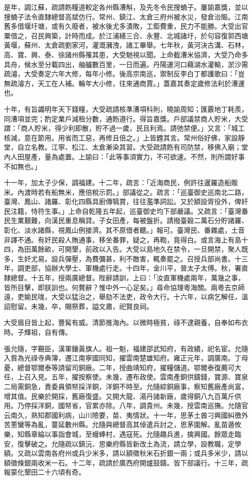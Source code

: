 \begin{pinyinscope}
是年，調江蘇，疏請飭糧道較定各州縣漕斛，及先冬令民搜蝻子。屢諭嘉獎，並以搜蝻子法令直隸總督高斌仿行。常州、鎮江、太倉三府州被水災，發倉治賑。江南舊多借堰圩塘，或有久廢者，被水後尤多潰敗，工鉅費重，民力不能勝。大受出官粟借之，召民興築，計時而成。於江浦繕三合、永豐、北城諸圩，於句容復郭西塘黃堰，蘇州、太倉疏劉家河，灌溉瀦洩，諸工畢舉。七年秋，黃河決古溝、石林，高、寶、興、泰、徐諸州縣罹其患，大受馳視以聞。上命截漕米協濟，大受乃命多具舟，候水至分載四出，舳艫數百里，一日而遍。丹陽運河口藉湖水灌輸，淤沙需疏濬，大受奏定六年大修，每年小修。後高宗南巡，禦制反李白丁都護歌曰：「豈無疏濬方，天工在人補。輪年大小修，往來通商賈。」蓋嘉其奏定歲修法利於漕運也。

十年，有旨蠲明年天下錢糧，大受疏請核準漕項科則，曉諭周知；匯覈地丁耗羨，同漕項並完；酌定業戶減租分數，通飭遵行。得旨嘉獎。戶部議禁商人貯米，大受謂：「商人貯米，得少利即散，貯不過一歲，民且利焉。請弛禁便。」又言：「城工核減，意在節用。用省而工惡，再修且倍之。」上皆韙其言。常州俗好佛，家設靜堂，自立名教。江寧、松江、太倉漸染其習。大受疏請飭有司防禁，移佛入廟；堂內人田屋產，量為處置。上諭曰：「此等事須實力，不可欲速。不然，則所謂好事不如無也。」

十一年，加太子少保，調福建。十二年，疏言：「近海商民，例許往暹羅造船販米。內渡時若有船無米，應倍稅示罰。」部議從之。疏言：「巡臺御史巡南北二路，臺灣、鳳山、諸羅、彰化四縣具廚傳犒賞，往往濫準詞訟。又於額設胥役外，俾奸民注籍，恃符生事。」上命自乾隆五年起，巡臺御史均下部嚴議。又疏言：「臺灣番民生業艱難，向漢民重息稱貸。子女田產，每被盤折。請撥臺穀二萬石分貯諸羅、彰化、淡水諸縣，視鳳山例接濟。其不原借者聽。」報可。臺灣民、番雜處，土音非譯不通。有奸民殺人賄通事，移坐番罪，疑之，再鞫，竟得白。或言海上有島十四，為田萬餘畝，可開墾，前政以入告。大受以島地久在禁令，一旦開禁，聚人既多，生奸尤易。設兵彈壓，為費彌甚，利不敵害，輒奏罷之。召授兵部尚書。十三年，調吏部，協辦大學士、軍機處行走。十四年，金川平，晉太子太傅。秋，署直隸總督。十五年，授兩廣總督。陛辭請訓，上曰：「汝直軍機處兩年，萬幾之事，皆所目擊，即朕訓也。何贅辭？惟中外一心足矣。」尋命協理粵海關。兩粵去京師遠，吏媮民哤，大受以猛治之，舉劾不法吏，政令大行。十六年，以病乞解任，溫詔慰留。未幾，卒，賜祭葬，謚文肅，祀賢良祠。

大受眉目皆上起，豐髯有威。清節推海內。以微時極貧，祿不逮親養，自奉如布衣時。子輝祖，自有傳。

張允隨，字覲臣，漢軍鑲黃旗人。祖一魁，福建邵武知府，有政績，祀名宦。允隨入貲為光祿寺典簿，遷江南寧國同知，擢雲南楚雄知府。雍正元年，調廣南。丁母憂，總督鄂爾泰等請留司銅廠。二年，授曲靖知府，擢糧儲道。鄂爾泰復薦可大任，上召入見。五年，擢按察使。未幾，遷布政使。雲南產銅供鑄錢，寶源、寶泉二局需銅急，責委員領帑採洋銅，洋銅不時至。允隨綜銅廠事，察知舊廠產尚富，增其值。民樂於開採，舊廠復盛。又開大龍、湯丹諸新廠，歲得銅八九百萬斤供用。乃停採洋銅，國帑省，官累亦除。八年，調貴州。未幾，授雲南巡撫。允隨官云南久，熟知郡國利病，山川險要，苗、夷情狀。十一年，思茅土酋刁興國糾徼外苦蔥蠻等為亂，蔓延數州縣。允隨與總督高其倬遣兵討之，思茅圍解。亂苗遁攸樂，知縣章綸以事詣會城，至蟃蜯村，遇寇死。允隨趣兵進，擒興國。餘眾走臨安，復擊破之。允隨疏以鎮沅、思樂府縣皆新改土為流，請立學，設教職，定學額。又疏以雲南各府州或兵少米多，請以額徵秋米石折銀一兩；或兵多米少，請以額徵條銀兩收米一石。十二年，疏請於廣西府開爐鼓鑄。皆下部議行。十三年，疏報蒙化墾田二十六頃有奇。


\end{pinyinscope}
